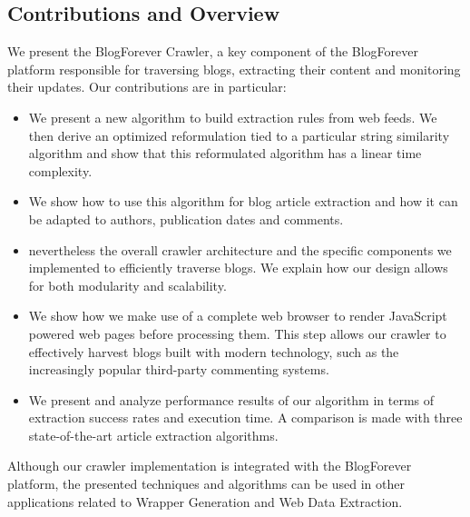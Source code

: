 \subsection{Contributions and Overview}
We present the BlogForever Crawler, a key component of the BlogForever platform responsible for traversing blogs, extracting their content and monitoring their updates. Our contributions are in particular:

\begin{itemize}
  \item We present a new algorithm to build extraction rules from web feeds. We then derive an optimized reformulation tied to a particular string similarity algorithm and show that this reformulated algorithm has a linear time complexity.
  \item We show how to use this algorithm for blog article extraction and how it can be adapted to authors, publication dates and comments.
  \item {} nevertheless the overall crawler architecture and the specific components we implemented to efficiently traverse blogs. We explain how our design allows for both modularity and scalability.
  \item We show how we make use of a complete web browser to render JavaScript powered web pages before processing them. This step allows our crawler to effectively harvest blogs built with modern technology, such as the increasingly popular third-party commenting systems.
  \item We present and analyze performance results of our algorithm in terms of extraction success rates and execution time. A comparison is made with three state-of-the-art article extraction algorithms.
\end{itemize}

Although our crawler implementation is integrated with the BlogForever platform, the presented techniques and algorithms can be used in other applications related to Wrapper Generation and Web Data Extraction.
